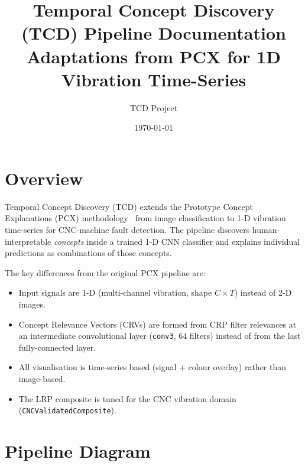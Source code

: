 \documentclass[11pt,a4paper]{article}
\title{Temporal Concept Discovery (TCD) Pipeline Documentation\\
       \large Adaptations from PCX for 1D Vibration Time-Series}
\author{TCD Project}
\date{\today}
\begin{document}
\maketitle
\tableofcontents
\newpage

\section{Overview}

Temporal Concept Discovery (TCD) extends the Prototype Concept Explanations
(PCX) methodology~\cite{pcx} from image classification to 1-D vibration
time-series for CNC-machine fault detection.  The pipeline discovers
human-interpretable \emph{concepts} inside a trained 1-D CNN classifier and
explains individual predictions as combinations of those concepts.

The key differences from the original PCX pipeline are:
\begin{itemize}
  \item Input signals are 1-D (multi-channel vibration, shape \(C \times T\))
        instead of 2-D images.
  \item Concept Relevance Vectors (CRVs) are formed from CRP filter
        relevances at an intermediate convolutional layer (\texttt{conv3},
        64 filters) instead of from the last fully-connected layer.
  \item All visualisation is time-series based (signal + colour overlay)
        rather than image-based.
  \item The LRP composite is tuned for the CNC vibration domain
        (\texttt{CNCValidatedComposite}).
\end{itemize}

\section{Pipeline Diagram}
\end{document}
